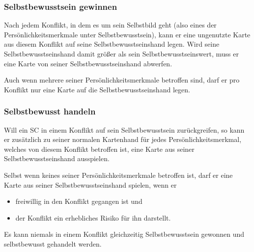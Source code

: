 \subsubsection{Selbstbewusstsein gewinnen}
Nach jedem Konflikt, in dem es um sein Selbstbild geht (also eines der Persönlichkeitsmerkmale unter Selbstbewusstsein), kann er eine ungenutzte Karte aus diesem Konflikt auf seine Selbstbewusstseinshand legen. Wird seine Selbstbewusstseinshand damit größer als sein Selbstbewusstseinswert, muss er eine Karte von seiner Selbstbewusstseinshand abwerfen.

Auch wenn mehrere seiner Persönlichkeitsmerkmale betroffen sind, darf er pro Konflikt nur eine Karte auf die Selbstbewusstseinshand legen.

\subsubsection{Selbstbewusst handeln}
Will ein SC in einem Konflikt auf sein Selbstbewusstsein zurückgreifen, so kann er zusätzlich zu seiner normalen Kartenhand für jedes Persönlichkeitsmerkmal, welches von diesem Konflikt betroffen ist, eine Karte aus seiner Selbstbewusstseinshand ausspielen.

Selbst wenn keines seiner Persönlichkeitsmerkmale betroffen ist, darf er eine Karte aus seiner Selbstbewusstseinshand spielen, wenn er
\begin{itemize}
\item freiwillig in den Konflikt gegangen ist und
\item der Konflikt ein erhebliches Risiko für ihn darstellt.
\end{itemize}
Es kann niemals in einem Konflikt gleichzeitig Selbstbewusstsein gewonnen und selbstbewusst gehandelt werden.
